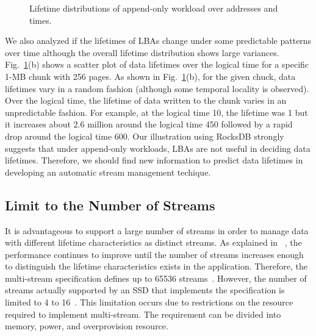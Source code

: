 \begin{figure}[t]
	\centering
	\hfill
	\hspace{10pt}
	\caption{Lifetime distributions of append-only workload over addresses and times.} %
	\label{fig:lba_lifetime}
\end{figure}


We also analyzed 
if the lifetimes of LBAs change under some predictable patterns over time 
although the overall lifetime distribution shows large variances.
Fig.~\ref{fig:lba_lifetime}(b) shows a scatter plot of data lifetimes over the logical time 
for a specific 1-MB chunk with 256 pages. 
As shown in Fig.~\ref{fig:lba_lifetime}(b), 
for the given chuck, data lifetimes vary in a random fashion
(although some temporal locality is observed).
Over the logical time, the lifetime of data written to the chunk 
varies in an unpredictable fashion.  
For example, at the logical time 10, the lifetime was 1 but it increases about 
2.6 million around the logical time 450 
followed by a rapid drop around the logical time 600. 
Our illustration using RocksDB strongly suggests that under append-only
workloads, LBAs are not useful in deciding data lifetimes.
Therefore, we should find new information 
to predict data lifetimes in developing an automatic stream management techique.


\subsection{Limit to the Number of Streams}
It is advantageous to support a large number of streams in order to manage data with different lifetime characteristics as distinct streams.
As explained in ~\cite{MultiStream}, the performance continues to improve until 
the number of streams increases enough to distinguish the lifetime characteristics exists in the application.
Therefore, the multi-stream specification defines up to 65536 streams~\cite{T10, NVMe}.
However, the number of streams actually supported by an SSD that implements the specification is limited to 4 to 16~\cite{MultiStream, Level, AutoStream}.
This limitation occurs due to restrictions on the resource required to implement multi-stream. The requirement can be divided into memory, power, and overprovision resource.

